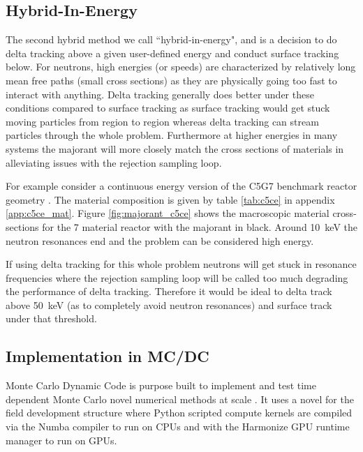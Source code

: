 \subsection{Hybrid-In-Energy}
\label{sec:cutoff}

The second hybrid method we call ``hybrid-in-energy", and is a decision to do delta tracking above a given user-defined energy and conduct surface tracking below.
For neutrons, high energies (or speeds) are characterized by relatively long mean free paths (small cross sections) as they are physically going too fast to interact with anything.
Delta tracking generally does better under these conditions compared to surface tracking as surface tracking would get stuck moving particles from region to region whereas delta tracking can stream particles through the whole problem.
Furthermore at higher energies in many systems the majorant will more closely match the cross sections of materials in alleviating issues with the rejection sampling loop.

For example consider a continuous energy version of the C5G7 benchmark reactor geometry \cite{jia_hou_oecdnea_2017}.
The material composition is given by table \ref{tab:c5ce} in appendix \ref{app:c5ce_mat}.
Figure \ref{fig:majorant_c5ce} shows the macroscopic material cross-sections for the 7 material reactor with the majorant in black.
Around \SI{10}{\kilo\electronvolt} the neutron resonances end and the problem can be considered high energy.

If using delta tracking for this whole problem neutrons will get stuck in resonance frequencies where the rejection sampling loop will be called too much degrading the performance of delta tracking.
Therefore it would be ideal to delta track above \SI{50}{\kilo\electronvolt} (as to completely avoid neutron resonances) and surface track under that threshold.

\subsection{Implementation in MC/DC}
\label{sec:implementation}

Monte Carlo Dynamic Code is purpose built to implement and test time dependent Monte Carlo novel numerical methods at scale \cite{morgan_2025_monte}.
It uses a novel for the field development structure where Python scripted compute kernels are compiled via the Numba compiler to run on CPUs and with the Harmonize GPU runtime manager to run on GPUs.

